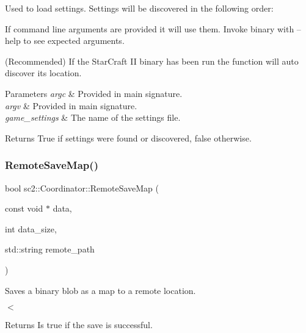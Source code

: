 Used to load settings. Settings will be discovered in the following order\+:
\begin{DoxyEnumerate}
\item If command line arguments are provided it will use them. Invoke binary with --help to see expected arguments.
\item (Recommended) If the Star\+Craft II binary has been run the function will auto discover its location. 
\begin{DoxyParams}{Parameters}
{\em argc} & Provided in main signature. \\
\hline
{\em argv} & Provided in main signature. \\
\hline
{\em game\+\_\+settings} & The name of the settings file. \\
\hline
\end{DoxyParams}
\begin{DoxyReturn}{Returns}
True if settings were found or discovered, false otherwise. 
\end{DoxyReturn}

\end{DoxyEnumerate}\mbox{\label{classsc2_1_1_coordinator_abddb83c4a267e3592932da7d198a97d5}} 
\subsubsection{\texorpdfstring{Remote\+Save\+Map()}{RemoteSaveMap()}}
{\footnotesize\ttfamily bool sc2\+::\+Coordinator\+::\+Remote\+Save\+Map (\begin{DoxyParamCaption}\item[{const void $\ast$}]{data,  }\item[{int}]{data\+\_\+size,  }\item[{std\+::string}]{remote\+\_\+path }\end{DoxyParamCaption})}



Saves a binary blob as a map to a remote location. 

$<$ \begin{DoxyReturn}{Returns}
Is true if the save is successful. 
\end{DoxyReturn}
\mbox{\label{classsc2_1_1_coordinator_ab46aec5712f6ec8ef12b03854f6e0495}} 
